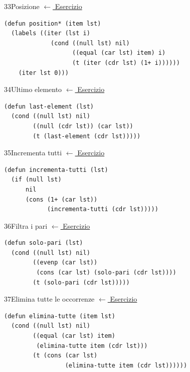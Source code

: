 \label{sol:33}
\begin{solbox}{33}{Posizione}
\small\color{black!55}\hyperref[ex:33]{$\leftarrow$ Esercizio}\normalsize\color{black}
\begin{lstlisting}
(defun position* (item lst)
  (labels ((iter (lst i)
             (cond ((null lst) nil)
                   ((equal (car lst) item) i)
                   (t (iter (cdr lst) (1+ i))))))
    (iter lst 0)))
\end{lstlisting}
\end{solbox}

\label{sol:34}
\begin{solbox}{34}{Ultimo elemento}
\small\color{black!55}\hyperref[ex:34]{$\leftarrow$ Esercizio}\normalsize\color{black}
\begin{lstlisting}
(defun last-element (lst)
  (cond ((null lst) nil)
        ((null (cdr lst)) (car lst))
        (t (last-element (cdr lst)))))
\end{lstlisting}
\end{solbox}

\label{sol:35}
\begin{solbox}{35}{Incrementa tutti}
\small\color{black!55}\hyperref[ex:35]{$\leftarrow$ Esercizio}\normalsize\color{black}
\begin{lstlisting}
(defun incrementa-tutti (lst)
  (if (null lst)
      nil
      (cons (1+ (car lst))
            (incrementa-tutti (cdr lst)))))
\end{lstlisting}
\end{solbox}

\label{sol:36}
\begin{solbox}{36}{Filtra i pari}
\small\color{black!55}\hyperref[ex:36]{$\leftarrow$ Esercizio}\normalsize\color{black}
\begin{lstlisting}
(defun solo-pari (lst)
  (cond ((null lst) nil)
        ((evenp (car lst))
         (cons (car lst) (solo-pari (cdr lst))))
        (t (solo-pari (cdr lst)))))
\end{lstlisting}
\end{solbox}

\label{sol:37}
\begin{solbox}{37}{Elimina tutte le occorrenze}
\small\color{black!55}\hyperref[ex:37]{$\leftarrow$ Esercizio}\normalsize\color{black}
\begin{lstlisting}
(defun elimina-tutte (item lst)
  (cond ((null lst) nil)
        ((equal (car lst) item)
         (elimina-tutte item (cdr lst)))
        (t (cons (car lst)
                 (elimina-tutte item (cdr lst))))))
\end{lstlisting}
\end{solbox}

